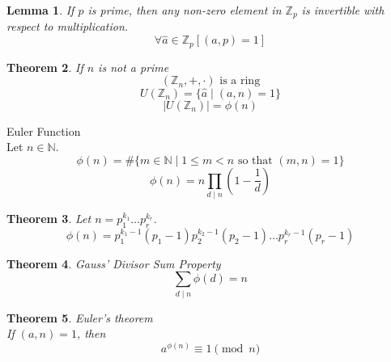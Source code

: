\documentclass[letterpaper, 12pt]{article}
\newtheorem{theorem}{Theorem}[section]
\newtheorem{lemma}[theorem]{Lemma}
\newenvironment{definition}[1][Definition]{\begin{trivlist}
\item[\hskip \labelsep {\bfseries #1}]}{\end{trivlist}}
\newcommand{\N}{\mathbb{N}}
\newcommand{\Z}{\mathbb{Z}}
\newcommand{\0}{\emptyset}
\begin{document}
    \begin{lemma}
        If $p$ is prime, then any non-zero element in $\Z_p$ is invertible with respect to 
        multiplication.
        \[\forall \hat{a} \in \Z_p [(a, p) = 1]\]
    \end{lemma}
    \begin{theorem}
        If $n$ is not a prime 
        \[(\Z_n, +, \cdot) \text{ is a ring}\]
        \[U(\Z_n) = \{\hat{a} \mid (a, n) = 1\}\]
        \[|U(\Z_n)| = \phi(n)\]
    \end{theorem}
    \begin{definition}
        Euler Function \\
        Let $n \in \N$.
        \[\phi(n) = \#\{m \in \N \mid 1 \le m < n \text{ so that } (m, n) = 1\}\]
        \[\phi(n) = n \prod_{d \mid n} \left(1 - \frac{1}{d}\right)\]
    \end{definition}
    \begin{theorem}
        Let $n = p_1^{k_1} \dots p_r^{k_r}$.
        \[\phi(n) = p_1^{k_1-1}(p_1-1)p_2^{k_2-1}(p_2-1) \dots p_r^{k_r-1}(p_r-1)\]
    \end{theorem}
    \begin{theorem}
        Gauss' Divisor Sum Property
        \[\sum_{d \mid n} \phi(d) = n\]
    \end{theorem}
    \begin{theorem}
        Euler's theorem \\
        If $(a, n) = 1$, then 
        \[a^{\phi(n)} \equiv 1 \pmod n\]
    \end{theorem}
\end{document}
